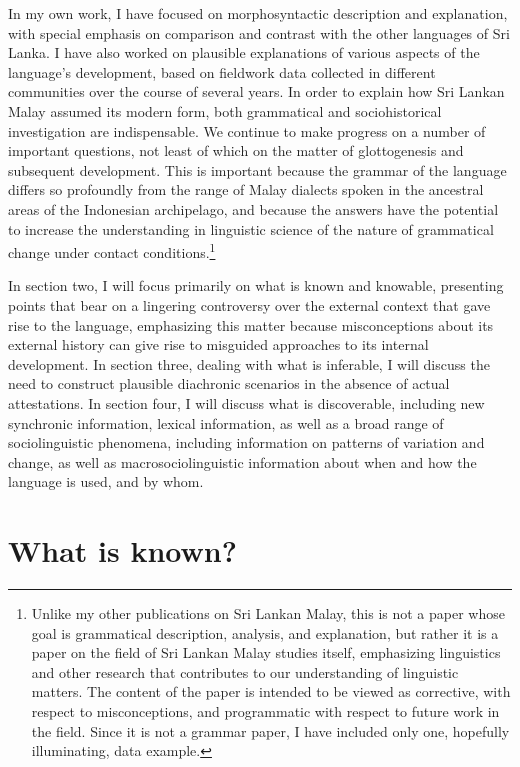 In my own work, I have focused on morphosyntactic description and explanation, with special emphasis on comparison and contrast with the other languages of Sri Lanka. I have also worked on plausible explanations of various aspects of the language's development, based on fieldwork data collected in different communities over the course of several years. In order to explain how Sri Lankan Malay assumed its modern form, both grammatical and sociohistorical investigation are indispensable. We continue to make progress on a number of important questions, not least of which on the matter of glottogenesis and subsequent development. This is important because the grammar of the language differs so profoundly from the range of Malay dialects spoken in the ancestral areas of the Indonesian archipelago, and because the answers have the potential to increase the understanding in linguistic science of the nature of grammatical change under contact conditions.\footnote{Unlike
  my other publications on Sri Lankan Malay, this is not a paper whose goal is grammatical description, analysis, and explanation, but rather it is a paper on the field of Sri Lankan Malay studies itself, emphasizing linguistics and other research that contributes to our understanding of linguistic matters. The content of the paper is intended to be viewed as corrective, with respect to misconceptions, and programmatic with respect to future work in the field. Since it is not a grammar paper, I have included only one, hopefully illuminating, data example.
}

In section two, I will focus primarily on what is known and knowable, presenting points that bear on a lingering controversy over the external context that gave rise to the language, emphasizing this matter because misconceptions about its external history can give rise to misguided approaches to its internal development. In section three, dealing with what is inferable, I will discuss the need to construct plausible diachronic scenarios in the absence of actual attestations. In section four, I will discuss what is discoverable, including new synchronic information,  lexical information, as well as a broad range of sociolinguistic phenomena, including information on patterns of variation and change, as well as macrosociolinguistic information about when and how the language is used, and by whom.

\section{What is known?}%


